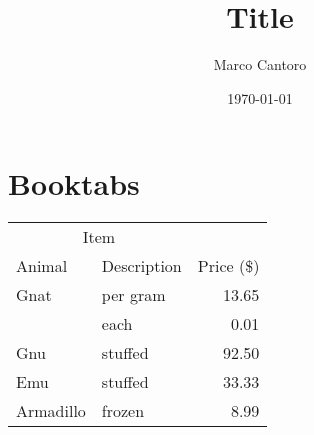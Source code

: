 \documentclass[10pt,a4paper]{article}
\begin{document}

\author{Marco Cantoro}
\title{Title}
\date{\today}

\maketitle
\newpage

\tableofcontents
\newpage



\section[Booktabs]{Booktabs}
\begin{tabular}{@{}llr@{}}
  \toprule
  \multicolumn{2}{c}{Item} \\
  \cmidrule(r){1-2}
  Animal & Description & Price (\$)\\
  \midrule
  Gnat & per gram & 13.65 \\
       & each     &  0.01 \\
  Gnu  & stuffed  & 92.50 \\
  Emu  & stuffed  & 33.33 \\
  Armadillo & frozen & 8.99 \\
  \bottomrule
\end{tabular}


\end{document}
